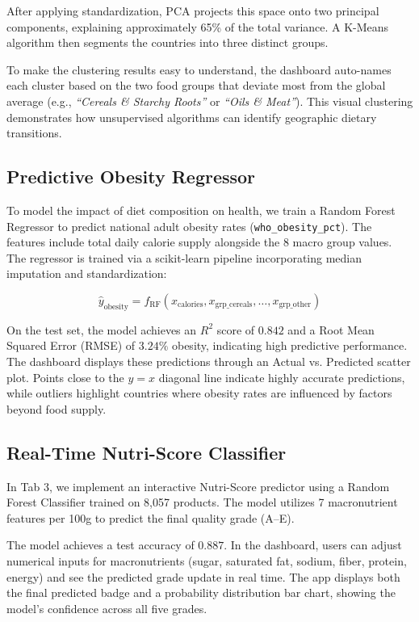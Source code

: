 \documentclass[10pt, a4paper]{article}
\begin{document}
After applying standardization, PCA projects this space onto two principal components, explaining approximately 65\% of the total variance. A K-Means algorithm then segments the countries into three distinct groups.

To make the clustering results easy to understand, the dashboard auto-names each cluster based on the two food groups that deviate most from the global average (e.g., \textit{``Cereals \& Starchy Roots''} or \textit{``Oils \& Meat''}). This visual clustering demonstrates how unsupervised algorithms can identify geographic dietary transitions.

\subsection{Predictive Obesity Regressor}
To model the impact of diet composition on health, we train a Random Forest Regressor to predict national adult obesity rates (\texttt{who\_obesity\_pct}). The features include total daily calorie supply alongside the 8 macro group values. The regressor is trained via a scikit-learn pipeline incorporating median imputation and standardization:

\begin{equation}
\hat{y}_{\text{obesity}} = f_{\text{RF}}\left(x_{\text{calories}}, x_{\text{grp\_cereals}}, \dots, x_{\text{grp\_other}}\right)
\end{equation}

On the test set, the model achieves an $R^2$ score of $0.842$ and a Root Mean Squared Error (RMSE) of $3.24\%$ obesity, indicating high predictive performance. The dashboard displays these predictions through an Actual vs. Predicted scatter plot. Points close to the $y=x$ diagonal line indicate highly accurate predictions, while outliers highlight countries where obesity rates are influenced by factors beyond food supply.

\subsection{Real-Time Nutri-Score Classifier}
In Tab 3, we implement an interactive Nutri-Score predictor using a Random Forest Classifier trained on 8,057 products. The model utilizes 7 macronutrient features per 100g to predict the final quality grade (A--E).

The model achieves a test accuracy of $0.887$. In the dashboard, users can adjust numerical inputs for macronutrients (sugar, saturated fat, sodium, fiber, protein, energy) and see the predicted grade update in real time. The app displays both the final predicted badge and a probability distribution bar chart, showing the model's confidence across all five grades.
\end{document}
